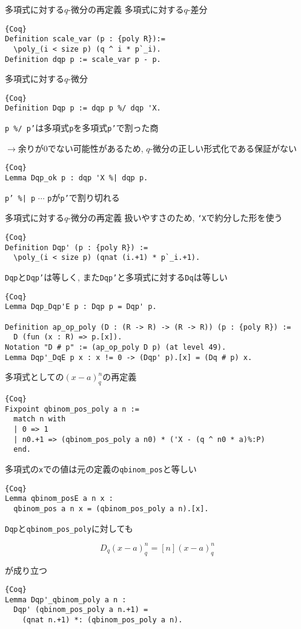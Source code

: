 \documentclass[dvipdfmx,cjk]{beamer}
\theoremstyle{mystyle}
\newcommand{\0}{\textbf{0}}
\begin{document}
\begin{frame}[fragile]{多項式に対する$q$-微分の再定義}
	多項式に対する$q$-差分 \pause
	\begin{lstlisting}{Coq}
Definition scale_var (p : {poly R}):=
  \poly_(i < size p) (q ^ i * p`_i).
Definition dqp p := scale_var p - p. 
\end{lstlisting} \pause
	多項式に対する$q$-微分 \pause
	\begin{lstlisting}{Coq}
Definition Dqp p := dqp p %/ dqp 'X.
\end{lstlisting}
	{\tt p \%/ p'}は多項式{\tt p}を多項式{\tt p'}で割った商 \pause
	
	$\to$余りが$0$でない可能性があるため, $q$-微分の正しい形式化である保証がない \pause
	\begin{lstlisting}{Coq}
Lemma Dqp_ok p : dqp 'X %| dqp p.
\end{lstlisting}
	{\tt p' \%| p} $\cdots$ {\tt p}が{\tt p'}で割り切れる
\end{frame}

\begin{frame}[fragile]{多項式に対する$q$-微分の再定義}
	扱いやすさのため, {\tt `X}で約分した形を使う
	\begin{lstlisting}{Coq}
Definition Dqp' (p : {poly R}) :=
  \poly_(i < size p) (qnat (i.+1) * p`_i.+1).
\end{lstlisting} \pause
	{\tt Dqp}と{\tt Dqp'}は等しく, また{\tt Dqp'}と多項式に対する{\tt Dq}は等しい
	\begin{lstlisting}{Coq}
Lemma Dqp_Dqp'E p : Dqp p = Dqp' p.
 
Definition ap_op_poly (D : (R -> R) -> (R -> R)) (p : {poly R}) :=
  D (fun (x : R) => p.[x]).
Notation "D # p" := (ap_op_poly D p) (at level 49).
Lemma Dqp'_DqE p x : x != 0 -> (Dqp' p).[x] = (Dq # p) x.\end{lstlisting}
\end{frame}

\begin{frame}[fragile]{多項式としての$(x - a)^n_q$の再定義}
	\begin{lstlisting}{Coq}
Fixpoint qbinom_pos_poly a n :=
  match n with
  | 0 => 1
  | n0.+1 => (qbinom_pos_poly a n0) * ('X - (q ^ n0 * a)%:P)
  end. \end{lstlisting} \pause
	多項式の{\tt x}での値は元の定義の{\tt qbinom\_pos}と等しい
	\begin{lstlisting}{Coq}
Lemma qbinom_posE a n x :
  qbinom_pos a n x = (qbinom_pos_poly a n).[x].
\end{lstlisting} \pause
	{\tt Dqp}と{\tt qbinom\_pos\_poly}に対しても
	\begin{screen}
		\[
			D_q (x - a)^n_q = [n] (x - a)^n_q
		\]
	\end{screen}
	が成り立つ \pause
	\begin{lstlisting}{Coq}
Lemma Dqp'_qbinom_poly a n :
  Dqp' (qbinom_pos_poly a n.+1) =
    (qnat n.+1) *: (qbinom_pos_poly a n).
\end{lstlisting}
\end{frame}
\end{document}

